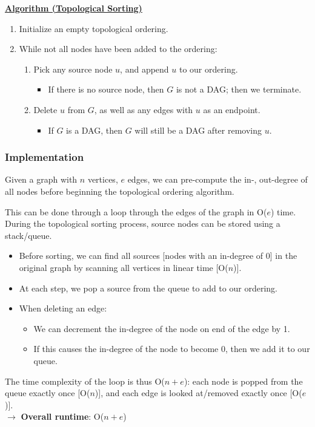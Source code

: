 \documentclass[12pt]{extarticle}
\theoremstyle{definition}
\theoremstyle{remark}
\newcommand{\probtitle}[1]{\noindent \textbf{\ul{#1}}}
\begin{document}
\begin{tcolorbox}[colback=blue!75!red!10!white]
    \probtitle{Algorithm (Topological Sorting)}
    \begin{enumerate}
        \item Initialize an empty topological ordering.
        \item While not all nodes have been added to the ordering: \begin{enumerate}
            \item Pick any source node $u$, and append $u$ to our ordering. \begin{itemize}
                \item If there is no source node, then $G$ is not a DAG; then we terminate.
            \end{itemize}
            \item Delete $u$ from $G$, as well as any edges with $u$ as an endpoint.\begin{itemize}
                \item If $G$ is a DAG, then $G$ will still be a DAG after removing $u$.
            \end{itemize}
        \end{enumerate}
    \end{enumerate}
\end{tcolorbox}

\subsubsection*{Implementation}
Given a graph with $n$ vertices, $e$ edges, we can pre-compute the in-, out-degree of all nodes before beginning the topological ordering algorithm. 

This can be done through a loop through the edges of the graph in O($e$) time.\\

\noindent During the topological sorting process, source nodes can be stored using a stack/queue. \begin{itemize}
    \item Before sorting, we can find all sources [nodes with an in-degree of 0] in the original graph by scanning all vertices in linear time [O($n$)].
    \item At each step, we pop a source from the queue to add to our ordering.
    \item When deleting an edge: \begin{itemize}
        \item We can decrement the in-degree of the node on end of the edge by 1.
        \item If this causes the in-degree of the node to become 0, then we add it to our queue.
    \end{itemize}
\end{itemize}
The time complexity of the loop is thus O($n+e$): each node is popped from the queue exactly once [O($n$)], and each edge is looked at/removed exactly once [O($e$)].\\

\noindent$\rightarrow$ \textbf{Overall runtime}: O($n+e$)
\end{document}
